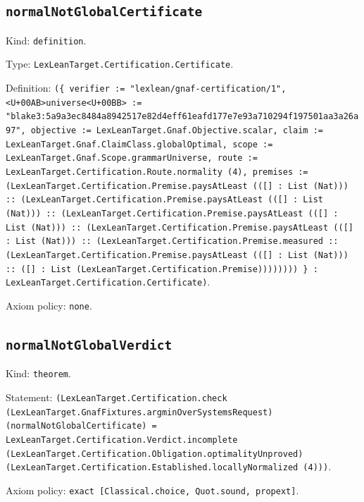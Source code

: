 \documentclass[11pt]{article}
\begin{document}
\subsection*{\texttt{normalNotGlobalCertificate}}
\noindent Kind: \texttt{definition}.\par
\noindent Type: \texttt{LexLeanTarget.Certification.Certificate}.\par
\noindent Definition: \texttt{(\{ verifier := "lexlean/gnaf-certification/1", <U+00AB>universe<U+00BB> := "blake3:5a9a3ec8484a8942517e82d4eff61eafd177e7e93a710294f197501aa3a26a97", objective := LexLeanTarget.Gnaf.Objective.scalar, claim := LexLeanTarget.Gnaf.ClaimClass.globalOptimal, scope := LexLeanTarget.Gnaf.Scope.grammarUniverse, route := LexLeanTarget.Certification.Route.normality (4), premises := (LexLeanTarget.Certification.Premise.paysAtLeast (([] : List (Nat))) :: (LexLeanTarget.Certification.Premise.paysAtLeast (([] : List (Nat))) :: (LexLeanTarget.Certification.Premise.paysAtLeast (([] : List (Nat))) :: (LexLeanTarget.Certification.Premise.paysAtLeast (([] : List (Nat))) :: (LexLeanTarget.Certification.Premise.measured :: (LexLeanTarget.Certification.Premise.paysAtLeast (([] : List (Nat))) :: ([] : List (LexLeanTarget.Certification.Premise)))))))) \} : LexLeanTarget.Certification.Certificate)}.\par
\noindent Axiom policy: \texttt{none}.\par
\subsection*{\texttt{normalNotGlobalVerdict}}
\noindent Kind: \texttt{theorem}.\par
\noindent Statement: \texttt{(LexLeanTarget.Certification.check (LexLeanTarget.GnafFixtures.argminOverSystemsRequest) (normalNotGlobalCertificate) = LexLeanTarget.Certification.Verdict.incomplete (LexLeanTarget.Certification.Obligation.optimalityUnproved) (LexLeanTarget.Certification.Established.locallyNormalized (4)))}.\par
\noindent Axiom policy: \texttt{exact [Classical.choice, Quot.sound, propext]}.\par
\end{document}
